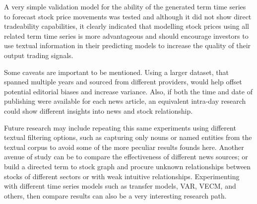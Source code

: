 \documentclass[conference,11pt]{IEEEtran}
\begin{document}
\par
A very simple validation model for the ability of the generated term time series to forecast stock price movements was tested and although it did not show direct tradeability capabilities, it clearly indicated that modelling stock prices using all related term time series is more advantageous and should encourage investors to use textual information in their predicting models to increase the quality of their output trading signals.

\par
Some caveats are important to be mentioned. Using a larger dataset, that spanned multiple years and sourced from different providers, would help offset potential editorial biases and increase variance. Also, if both the time and date of publishing were available for each news article, an equivalent intra-day research could show different insights into news and stock relationship.

\par
Future research may include repeating this same experiments using different textual filtering options, such as capturing only nouns or named entities from the textual corpus to avoid some of the more peculiar results founds here. Another avenue of study can be to compare the effectiveness of different news sources; or build a directed term to stock graph and procure unknown relationships between stocks of different sectors or with weak intuitive relationships. Experimenting with different time series models such as transfer models, VAR, VECM, and others, then compare results can also be a very interesting research path.


\end{document}

